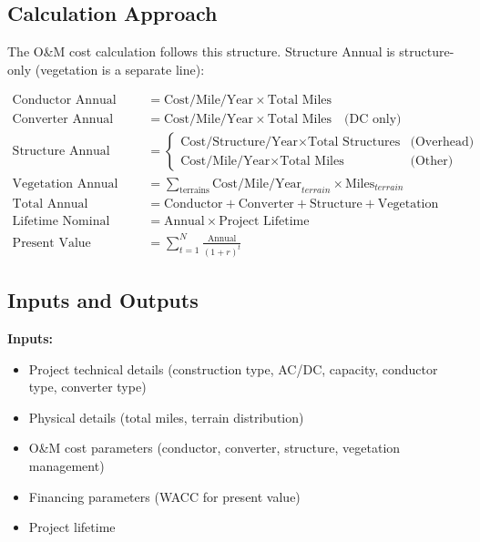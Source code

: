 \documentclass[ctcc_full_documentation.tex]{subfiles}
\begin{document}
\subsection{Calculation Approach}

The O\&M cost calculation follows this structure. Structure Annual is structure-only (vegetation is a separate line):

\begin{align}
\text{Conductor Annual} &= \text{Cost/Mile/Year} \times \text{Total Miles} \\
\text{Converter Annual} &= \text{Cost/Mile/Year} \times \text{Total Miles} \quad \text{(DC only)} \\
\text{Structure Annual (structure only)} &= \begin{cases}
\text{Cost/Structure/Year} \times \text{Total Structures} & \text{(Overhead)} \\
\text{Cost/Mile/Year} \times \text{Total Miles} & \text{(Other)}
\end{cases} \\
\text{Vegetation Annual} &= \sum_{\text{terrains}} \text{Cost/Mile/Year}_{terrain} \times \text{Miles}_{terrain} \\
\text{Total Annual} &= \text{Conductor} + \text{Converter} + \text{Structure} + \text{Vegetation} \\
\text{Lifetime Nominal} &= \text{Annual} \times \text{Project Lifetime} \\
\text{Present Value} &= \sum_{t=1}^{N} \frac{\text{Annual}}{(1 + r)^t}
\end{align}

\subsection{Inputs and Outputs}

\textbf{Inputs:}
\begin{itemize}
    \item Project technical details (construction type, AC/DC, capacity, conductor type, converter type)
    \item Physical details (total miles, terrain distribution)
    \item O\&M cost parameters (conductor, converter, structure, vegetation management)
    \item Financing parameters (WACC for present value)
    \item Project lifetime
\end{itemize}
\end{document}
